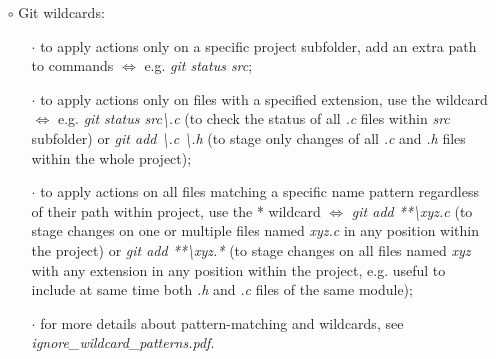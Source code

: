 \documentclass[a4paper,portrait,10pt]{article}   %
\newcommand{\mybulletlvA}{$\circ$}   %
\newcommand{\mybulletlvB}{$\cdot$}   %
\newcommand{\mydiv}{$\Leftrightarrow$ }   %
\newcommand{\mysapo}[1]{\textquotesingle #1\textquotesingle }   %
\newcommand{\myvspace}{\vspace{4mm}}   %
\begin{document}
\begin{itemize}
\item[\mybulletlvA] Git wildcards:
\begin{itemize}
  \item[\mybulletlvB] to apply actions only on a specific project subfolder, add an extra path to commands \mydiv e.g. \textit{git status src};
  \item[\mybulletlvB] to apply actions only on files with a specified extension, use the \mysapo{*} wildcard \mydiv e.g. \textit{git status src\textbackslash *.c} (to check the status of all \textit{.c} files within \textit{src} subfolder) or \textit{git add \textbackslash *.c \textbackslash *.h} (to stage only changes of all \textit{.c} and \textit{.h} files within the whole project);
  \item[\mybulletlvB] to apply actions on all files matching a specific name pattern regardless of their path within project, use the \mysapo{**} wildcard \mydiv \textit{git add **\textbackslash xyz.c} (to stage changes on one or multiple files named \textit{xyz.c} in any position within the project) or \textit{git add **\textbackslash xyz.*} (to stage changes on all files named \textit{xyz} with any extension in any position within the project, e.g. useful to include at same time both \textit{.h} and \textit{.c} files of the same module);
  \item[\mybulletlvB] for more details about pattern-matching and wildcards, see \textit{ignore\_wildcard\_patterns.pdf}.
\end{itemize}
\myvspace


\end{itemize}
\end{document}
